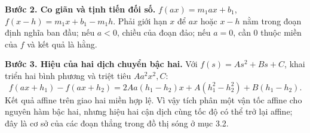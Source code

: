 \documentclass[10pt,a4paper]{article}
\begin{document}
\textbf{Bước 2. Co giãn và tịnh tiến đối số.} $f(ax)=m_1ax+b_1$, $f(x-h)=m_1x+b_1-m_1h$. Phải giới hạn $x$ để $ax$ hoặc $x-h$ nằm trong đoạn định nghĩa ban đầu; nếu $a<0$, chiều của đoạn đảo; nếu $a=0$, cần $0$ thuộc miền của $f$ và kết quả là hằng.

\textbf{Bước 3. Hiệu của hai dịch chuyển bậc hai.} Với $f(s)=As^2+Bs+C$, khai triển hai bình phương và triệt tiêu $Aa^2x^2,C$:
\[f(ax+h_1)-f(ax+h_2)=2Aa(h_1-h_2)x+A(h_1^2-h_2^2)+B(h_1-h_2).\]
Kết quả affine trên giao hai miền hợp lệ. Vì vậy tích phân một vận tốc affine cho nguyên hàm bậc hai, nhưng hiệu hai cận dịch cùng tốc độ có thể trở lại affine; đây là cơ sở của các đoạn thẳng trong đồ thị sóng ở mục 3.2.
\end{document}
